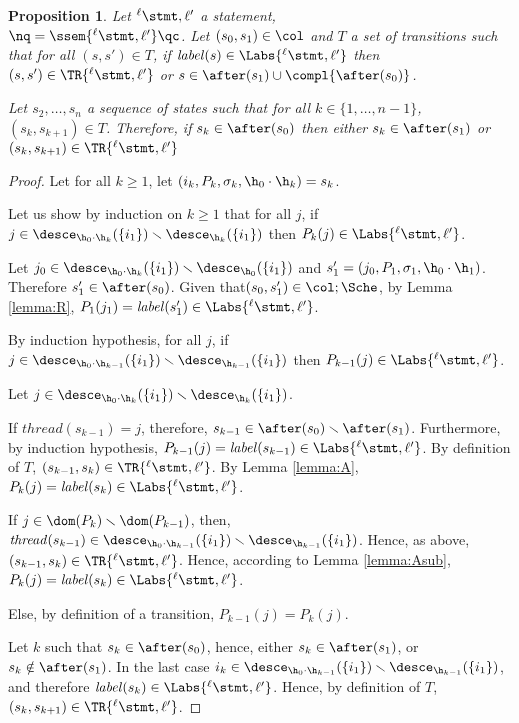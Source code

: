 \documentclass[12pt]{article}
\let\firstunion\cup
\let\cup\firstunion
\newcommand{\lab}{  {}^{\ell}}
\newcommand{\lbl}{\mathit{label}}
\newcommand{\thread}{\mathit{thread}}
\newtheorem{proposition}{Proposition}
\begin{document}
\begin{proposition}\label{prop:apres1}
 Let \(\lab\stmt,\ell'\) a statement, \\\(\nq=\ssem{\lab\stmt,\ell'}\qc\).
  Let \((s_0,s_1)\in\col\) and \(T\) a set of transitions such that for all \((s,s')\in T\), if \(\lbl(s)\in\Labs{\lab\stmt,\ell'}\) then \((s,s')\in \TR{\lab\stmt,\ell'}\) or \(s\in\after(s_1)\cup\compl{\after(s_0)}\). 
 
 Let \(s_2,\ldots,s_n\) a sequence of states such that for all \(k\in\{1,\ldots,n-1\}\), \((s_{k},s_{k+1})\in T\).
 Therefore, if \(s_k\in\after(s_0)\) then either \(s_k\in\after(s_1)\) or \((s_{k},s_{k+1})\in \TR{\lab\stmt,\ell'}\) 
\end{proposition}\begin{proof}Let for all \(k\geqslant 1\), let \((i_k,P_k,\m_k,\h_0\cdot\h_k)=s_k\).

 Let us show by induction on \(k\geqslant 1\) that for all \(j\), if \(j\in\desce_{\h_0\cdot\h_k}(\{i_1\})\smallsetminus \desce_{\h_k}(\{i_1\})\) then \(P_k(j)\in\Labs{\lab\stmt,\ell'}\).
 
Let \(j_0\in\desce_{\h_0\cdot\h_k}(\{i_1\})\smallsetminus \desce_{\h_0}(\{i_1\})\) and \(s'_1=(j_0,P_1,\m_1,\h_0\cdot\h_1)\). 
Therefore \(s'_1\in \after(s_0)\). 
Given that\((s_0,s'_1)\in \col;\Sche\),  by Lemma \ref{lemma:R}, \(P_1(j_1)=\lbl(s'_1)\in \Labs{\lab\stmt,\ell'}\). 
 
By induction hypothesis, for all \(j\), if \(j\in\desce_{\h_0\cdot\h_{k-1}}(\{i_1\})\smallsetminus \desce_{\h_{k-1}}(\{i_1\})\) then \(P_{k-1}(j)\in\Labs{\lab\stmt,\ell'}\).

 Let \(j\in \desce_{\h_0\cdot\h_k}(\{i_1\})\smallsetminus \desce_{\h_k}(\{i_1\})\).
 
 If \(\thread(s_{k-1})=j\), therefore, \(s_{k-1}\in\after(s_0)\smallsetminus\after(s_1)\). Furthermore, by induction hypothesis, \(P_{k-1}(j)=\lbl(s_{k-1})\in \Labs{\lab\stmt,\ell'} \). By definition of \(T\), \((s_{k-1},s_k)\in \TR{\lab\stmt,\ell'}\). By Lemma \ref{lemma:A}, \(P_{k}(j)=\lbl(s_k)\in \Labs{\lab\stmt,\ell'}\).
 
 If \(j\in\dom(P_{k})\smallsetminus\dom(P_{k-1})\), then, \(\thread(s_{k-1})\in \desce_{\h_0\cdot\h_{k-1}}(\{i_1\})\smallsetminus \desce_{\h_{k-1}}(\{i_1\})\). Hence, as above, \((s_{k-1},s_k)\in \TR{\lab\stmt,\ell'}\). Hence, according to Lemma \ref{lemma:Asub}, \(P_{k}(j)=\lbl(s_k)\in \Labs{\lab\stmt,\ell'}\).
 
 Else, by definition of a transition, \(P_{k-1}(j)=P_{k}(j)\).
 
 Let \(k\) such that \(s_k\in\after(s_0)\), hence, either \(s_k\in\after(s_1)\), or \(s_k\notin\after(s_1)\). In the last case \(i_k\in \desce_{\h_0\cdot\h_{k-1}}(\{i_1\})\smallsetminus \desce_{\h_{k-1}}(\{i_1\}) \), and therefore \(\lbl(s_k)\in \Labs{\lab\stmt,\ell'} \). Hence, by definition of \(T\), \((s_k,s_{k+1})\in\TR{\lab\stmt,\ell'}\).
\end{proof}
\end{document}
